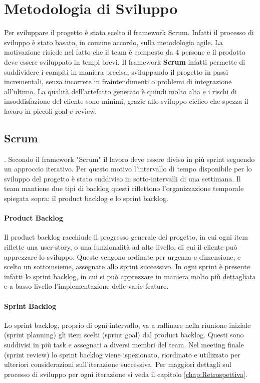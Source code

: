 \section{Metodologia di Sviluppo}
Per sviluppare il progetto è stata scelto il framework Scrum. Infatti il processo di sviluppo è stato basato, in comune accordo, sulla metodologia agile. La motivazione risiede nel fatto che il team è composto da 4 persone e il prodotto deve essere sviluppato in tempi brevi. Il framework \textbf{Scrum} infatti permette di suddividere i compiti in maniera precisa, sviluppando il progetto in passi incrementali, senza incorrere in fraintendimenti o problemi di integrazione all'ultimo. La qualità dell'artefatto generato è quindi molto alta e i rischi di insoddisfazione del cliente sono minimi, grazie allo sviluppo ciclico che spezza il lavoro in piccoli goal e review. 
    \subsection{Scrum}. 
    Secondo il framework "Scrum" il lavoro deve essere diviso in più sprint seguendo un approccio iterativo. Per questo motivo l'intervallo di tempo disponibile per lo sviluppo del progetto è stato suddiviso in sotto-intervalli di una settimana. 
    Il team mantiene due tipi di backlog questi riflettono l'organizzazione temporale spiegata sopra: il product backlog e lo sprint backlog. 
    
    \paragraph{Product Backlog}Il product backlog racchiude il progresso generale del progetto, in cui ogni item riflette una user-story, o una funzionalità ad alto livello, di cui il cliente può apprezzare lo sviluppo. Queste vengono ordinate per urgenza e dimensione, e scelto un sottoinsieme, assegnate allo sprint successivo. In ogni sprint è presente infatti lo sprint backlog, in cui si può apprezzare in maniera molto più dettagliata e a basso livello l'implementazione delle varie feature. 

    \paragraph{Sprint Backlog} Lo sprint backlog, proprio di ogni intervallo, va a raffinare nella riunione iniziale (sprint planning) gli item scelti (sprint goal) dal product backlog. Questi sono suddivisi in più task e assegnati a diversi membri del team. Nel meeting finale (sprint review) lo sprint backlog viene ispezionato, riordinato e utilizzato per ulteriori considerazioni sull'iterazione successiva. Per maggiori dettagli sul processo di sviluppo per ogni iterazione si veda il capitolo \ref{chap:Retrospettiva}.


